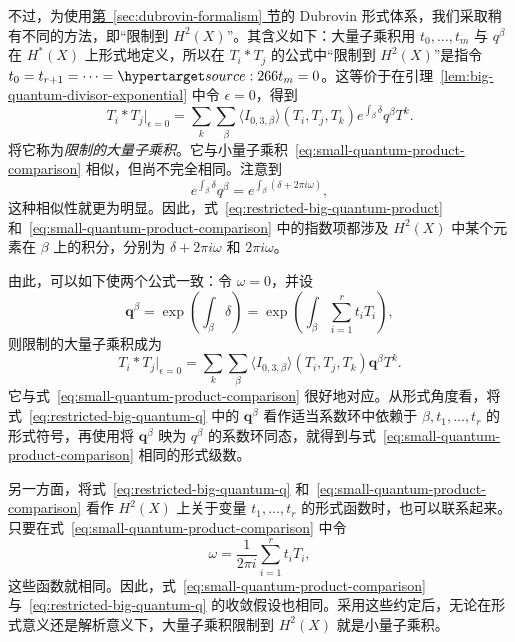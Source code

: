 不过，为使用\hyperref[sec:dubrovin-formalism]{第~\ref*{sec:dubrovin-formalism} 节}的 Dubrovin 形式体系，我们采取稍有不同的方法，即“限制到 $H^2(X)$”。其含义如下：大量子乘积用 $t_0,\ldots,t_m$ 与 $q^\beta$ 在 $H^*(X)$ 上形式地定义，所以在 $T_i*T_j$ 的公式中“限制到 $H^2(X)$”是指令 $t_0=t_{r+1}=\cdots=
\SourcePage{266}
t_m=0$。这等价于在引理~\ref{lem:big-quantum-divisor-exponential} 中令 $\epsilon=0$，得到
\begin{equation}\label{eq:restricted-big-quantum-product}
T_i*T_j\big|_{\epsilon=0}=\sum_k\sum_\beta
\langle I_{0,3,\beta}\rangle(T_i,T_j,T_k)e^{\int_\beta\delta}q^\beta T^k.
\end{equation}
将它称为\emph{限制的大量子乘积}。它与小量子乘积~\eqref{eq:small-quantum-product-comparison} 相似，但尚不完全相同。注意到
\[
e^{\int_\beta\delta}q^\beta=e^{\int_\beta(\delta+2\pi i\omega)},
\]
这种相似性就更为明显。因此，式~\eqref{eq:restricted-big-quantum-product} 和~\eqref{eq:small-quantum-product-comparison} 中的指数项都涉及 $H^2(X)$ 中某个元素在 $\beta$ 上的积分，分别为 $\delta+2\pi i\omega$ 和 $2\pi i\omega$。

由此，可以如下使两个公式一致：令 $\omega=0$，并设
\[
\mathbf q^\beta=\exp\left(\int_\beta\delta\right)
=\exp\left(\int_\beta\sum_{i=1}^rt_iT_i\right),
\]
则限制的大量子乘积成为
\begin{equation}\label{eq:restricted-big-quantum-q}
T_i*T_j\big|_{\epsilon=0}=\sum_k\sum_\beta
\langle I_{0,3,\beta}\rangle(T_i,T_j,T_k)\mathbf q^\beta T^k.
\end{equation}
它与式~\eqref{eq:small-quantum-product-comparison} 很好地对应。从形式角度看，将式~\eqref{eq:restricted-big-quantum-q} 中的 $\mathbf q^\beta$ 看作适当系数环中依赖于 $\beta,t_1,\ldots,t_r$ 的形式符号，再使用将 $\mathbf q^\beta$ 映为 $q^\beta$ 的系数环同态，就得到与式~\eqref{eq:small-quantum-product-comparison} 相同的形式级数。

另一方面，将式~\eqref{eq:restricted-big-quantum-q} 和~\eqref{eq:small-quantum-product-comparison} 看作 $H^2(X)$ 上关于变量 $t_1,\ldots,t_r$ 的形式函数时，也可以联系起来。只要在式~\eqref{eq:small-quantum-product-comparison} 中令
\begin{equation}\label{eq:quantum-coordinate-rescaling}
\omega=\frac1{2\pi i}\sum_{i=1}^rt_iT_i,
\end{equation}
这些函数就相同。因此，式~\eqref{eq:small-quantum-product-comparison} 与~\eqref{eq:restricted-big-quantum-q} 的收敛假设也相同。采用这些约定后，无论在形式意义还是解析意义下，大量子乘积限制到 $H^2(X)$ 就是小量子乘积。

